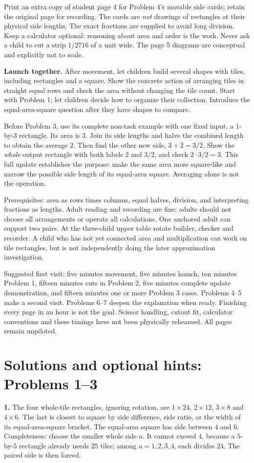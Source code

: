 \documentclass[11pt,letterpaper]{article}
\begin{document}
Print an extra copy of student page 4 for Problem 4's movable side cards; retain the original page for recording. The cards are \emph{not} drawings of rectangles at their physical side lengths. The exact fractions are supplied to avoid long division. Keep a calculator optional: reasoning about area and order is the work. Never ask a child to cut a strip $1/2716$ of a unit wide. The page 5 diagrams are conceptual and explicitly not to scale.

\textbf{Launch together.} After movement, let children build several shapes with tiles, including rectangles and a square. Show the concrete action of arranging tiles in straight equal rows and check the area without changing the tile count. Start with Problem 1; let children decide how to organize their collection. Introduce the equal-area-square question after they have shapes to compare.

Before Problem 3, use its complete non-task example with one fixed input, a $1$-by-$3$ rectangle. Its area is $3$. Join its side lengths and halve the combined length to obtain the average $2$. Then find the other new side, $3\div2=3/2$. Show the \emph{whole} output rectangle with both labels $2$ and $3/2$, and check $2\cdot3/2=3$. This full update establishes the purpose: make the same area more square-like and narrow the possible side length of its equal-area square. Averaging alone is not the operation.

Prerequisites: area as rows times columns, equal halves, division, and interpreting fractions as lengths. Adult reading and recording are fine; adults should not choose all arrangements or operate all calculations. One anchored adult can support two pairs. At the three-child upper table rotate builder, checker and recorder. A child who has not yet connected area and multiplication can work on tile rectangles, but is not independently doing the later approximation investigation.

Suggested first visit: five minutes movement, five minutes launch, ten minutes Problem 1, fifteen minutes cuts in Problem 2, five minutes complete update demonstration, and fifteen minutes one or more Problem 3 cases. Problems 4--5 make a second visit. Problems 6--7 deepen the explanation when ready. Finishing every page in an hour is not the goal. Scissor handling, cutout fit, calculator conventions and these timings have not been physically rehearsed. All pages remain unpiloted.
\newpage
\section*{Solutions and optional hints: Problems 1--3}
\textbf{1.} The four whole-tile rectangles, ignoring rotation, are $1\times24$, $2\times12$, $3\times8$ and $4\times6$. The last is closest to square by side difference, side ratio, or the width of its equal-area-square bracket. The equal-area square has side between $4$ and $6$. Completeness: choose the smaller whole side $a$. It cannot exceed $4$, because a $5$-by-$5$ rectangle already needs $25$ tiles; among $a=1,2,3,4$, each divides $24$. The paired side is then forced.
\end{document}
